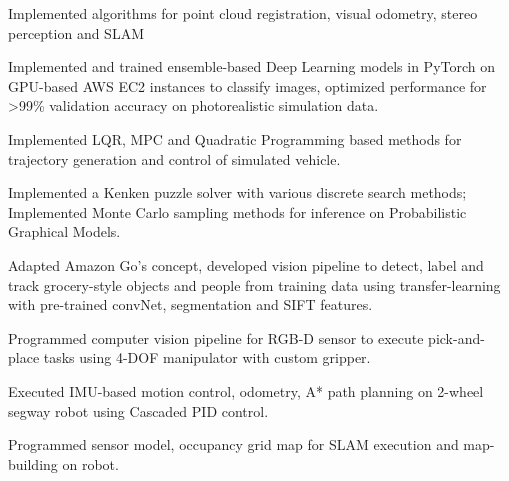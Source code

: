 \documentclass[letterpaper]{deedy-resume} %
\begin{document}
\begin{minipage}[t]{0.73\textwidth}

\newline
{}
\begin{tightitemize}
\item Implemented algorithms for point cloud registration, visual odometry, stereo perception and SLAM
\item Implemented and trained ensemble-based Deep Learning models in PyTorch on GPU-based AWS EC2 instances to classify images, optimized performance for >99\% validation accuracy on photorealistic simulation data.
\item Implemented LQR, MPC and Quadratic Programming based methods for trajectory generation and control of simulated vehicle.
\end{tightitemize}
\sectionspace %

\begin{tightitemize}
\item Implemented a Kenken puzzle solver with various discrete search methods; Implemented Monte Carlo sampling methods for inference on Probabilistic Graphical Models.
\end{tightitemize}

\begin{tightitemize}
\item Adapted Amazon Go’s concept, developed vision pipeline to detect, label and track grocery-style objects and people from training data using transfer-learning with pre-trained convNet, segmentation and SIFT features.
\end{tightitemize}

\begin{tightitemize}
\item Programmed computer vision pipeline for RGB-D sensor to execute pick-and-place tasks using 4-DOF manipulator with custom gripper.
\item Executed IMU-based motion control, odometry, A* path planning on 2-wheel segway robot using Cascaded PID control.
\item Programmed sensor model, occupancy grid map for SLAM execution and map-building on robot.
\end{tightitemize}


\end{minipage}
\end{document}
